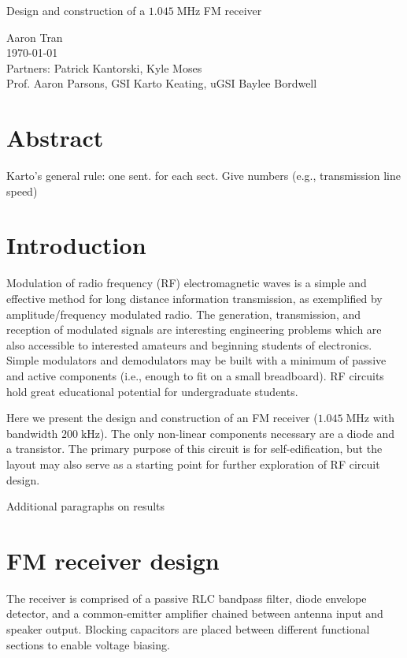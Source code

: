 \documentclass[11pt]{article}
\newcommand {\mt}{\mathrm}
\newcommand {\unit}[1]{\; \mt{#1}}
\begin{document}
\begin{center}
\Large{Design and construction of a $1.045 \unit{MHz}$ FM receiver}

\large
Aaron Tran \\
\today \\
Partners: Patrick Kantorski, Kyle Moses \\
Prof. Aaron Parsons, GSI Karto Keating, uGSI Baylee Bordwell
\end{center}

\section*{\sffamily Abstract}

Karto's general rule: one sent. for each sect.
Give numbers (e.g., transmission line speed)

\section{Introduction}

Modulation of radio frequency (RF) electromagnetic waves is a simple and
effective method for long distance information transmission, as exemplified by
amplitude/frequency modulated radio.  The generation, transmission, and
reception of modulated signals are interesting engineering problems which are
also accessible to interested amateurs and beginning students of electronics.
Simple modulators and demodulators may be built with a minimum
of passive and active components (i.e., enough to fit on a small breadboard).
RF circuits hold great educational potential for undergraduate students.

Here we present the design and construction of an FM receiver ($1.045
\unit{MHz}$ with bandwidth $200 \unit{kHz}$).  The only non-linear components
necessary are a diode and a transistor.  The primary purpose of this circuit is for self-edification, but the layout may also serve as a starting point for
further exploration of RF circuit design.

Additional paragraphs on results

\section{FM receiver design}

The receiver is comprised of a passive RLC bandpass filter, diode envelope
detector, and a common-emitter amplifier chained between antenna input and
speaker output.  Blocking capacitors are placed between different functional
sections to enable voltage biasing.
\end{document}
